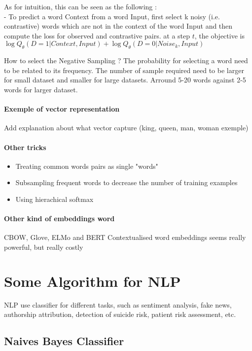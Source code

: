 				As for intuition, this can be seen as the following : \\
				- To predict a word Context from a word Input, first select k noisy (i.e. contrastive) words which are not in the context of the word Input and then compute the loss for observed and contrastive pairs. at a step $t$, the objective is $ \log Q_\theta(D=1 | Context, Input) + \log Q_\theta(D=0 | Noise_k, Input)$

				How to select the Negative Sampling ? The probability for selecting a word need to be related to its frequency. The number of sample required need to be larger for small dataset and smaller for large datasets. Arround 5-20 words against 2-5 words for larger dataset. 

			\paragraph*{Exemple of vector representation}
				Add explanation about what vector capture (king, queen, man, woman exemple)
		
			\paragraph*{Other tricks}
				\begin{itemize}
					\item Treating common words pairs as single "words"
					\item Subsampling frequent words to decrease the number of training examples
					\item Using hierachical softmax
				\end{itemize}

			\paragraph*{Other kind of embeddings word}
				CBOW, Glove, ELMo and BERT
			Contextualised word embeddings seems really powerful, but really costly


	\section{Some Algorithm for NLP}

		NLP use classifier for different tasks, such as sentiment analysis, fake news, authorship  attribution, detection of suicide risk, patient risk assessment, etc.

		\subsection{Naives Bayes Classifier}

